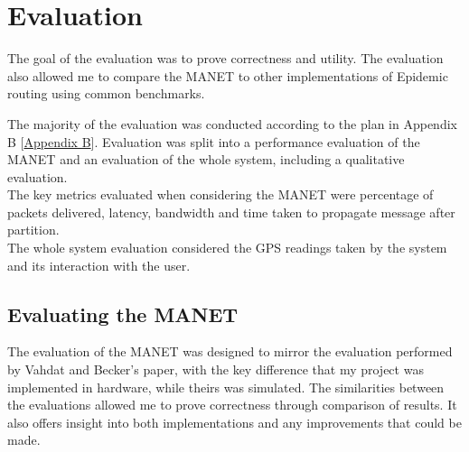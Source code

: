 \documentclass[12pt,a4paper]{report}
\newcommand{\newchapter}[2]{
    \setcounter{chapter}{#1}
    \setcounter{section}{0}
    \chapter*{#2}
    \addcontentsline{toc}{chapter}{#1 #2}
}
\begin{document}
\newchapter{4}{Evaluation}
\setcounter{figure}{0}
The goal of the evaluation was to prove correctness and utility. The evaluation also allowed me to compare the MANET to other implementations of Epidemic routing using common benchmarks.

The majority of the evaluation was conducted according to the plan in Appendix B [\hyperref[appendixB]{Appendix B}]. Evaluation was split into a performance evaluation of the MANET and an evaluation of the whole system, including a qualitative evaluation. \\
The key metrics evaluated when considering the MANET were percentage of packets delivered, latency, bandwidth and time taken to propagate message after partition. \\
The whole system evaluation considered the GPS readings taken by the system and its interaction with the user.\\ 

\section{Evaluating the MANET}
The evaluation of the MANET was designed to mirror the evaluation performed by Vahdat and Becker's paper, with the key difference that my project was implemented in hardware, while theirs was simulated. The similarities between the evaluations allowed me to prove correctness through comparison of results. It also offers insight into both implementations and any improvements that could be made. \\
\end{document}
